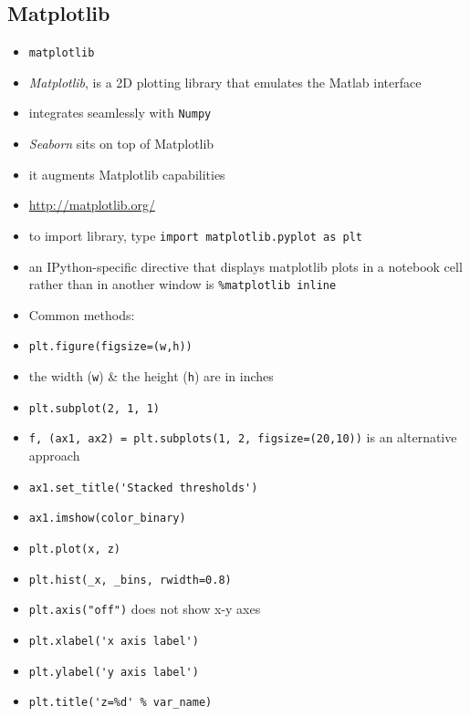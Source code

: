 \documentclass[onecolumn]{IEEEtran} %
\begin{document}
\newpage
\subsection{Matplotlib}
\begin{itemize}
    \item \verb|matplotlib|
    \bi
        \item \emph{Matplotlib}, is a 2D plotting library that emulates the Matlab interface
        \item integrates seamlessly with \verb|Numpy|
        \item \emph{Seaborn} sits on top of Matplotlib
        \bi
            \item it augments Matplotlib capabilities
        \ei
        \item \url{http://matplotlib.org/}
        \item to import library, type \newline
        \verb|import matplotlib.pyplot as plt|
        \item an IPython-specific directive that displays matplotlib plots in a notebook cell rather than in another window is  \newline \verb|%matplotlib inline|
    \ei
    \item Common methods:
    \bi
        \item \verb|plt.figure(figsize=(w,h))|
        \bi
            \item the width (\verb|w|) \& the height (\verb|h|) are in inches
        \ei
        \item \verb|plt.subplot(2, 1, 1)|
        \item \verb|f, (ax1, ax2) = plt.subplots(1, 2, figsize=(20,10))| \newline is an alternative approach
        \item \verb|ax1.set_title('Stacked thresholds')|
        \item \verb|ax1.imshow(color_binary)|
        \item \verb|plt.plot(x, z)|
        \item \verb|plt.hist(_x, _bins, rwidth=0.8)|
        \item \verb|plt.axis("off")| \newline does not show x-y axes
        \item \verb|plt.xlabel('x axis label')|
        \item \verb|plt.ylabel('y axis label')|
        \item \verb|plt.title('z=%d' % var_name)|

\end{itemize}
\end{document}
